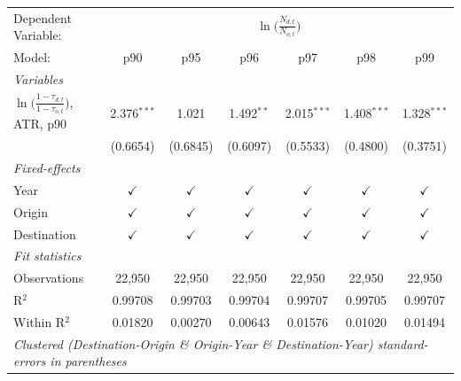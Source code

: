 \documentclass[11pt]{article}
\begin{document}
\begin{table}[H]
	\centering
	\begin{threeparttable}[b]
		\small
		\begin{tabular}{lcccccc}
			\toprule
			Dependent Variable: & \multicolumn{6}{c}{$\ln \biggr ( \frac{N_{d, t}}{N_{o, t}} \biggr)$}\\
			Model:                                                                       & p90           & p95           & p96           & p97           & p98           & p99\\  
			\midrule
			\emph{Variables}\\
			$\ln \biggr(\frac{1 - \tau_{d, t}}{1 - \tau_{o, t}} \biggr)$, ATR, p90       & 2.376$^{***}$ &   1.021             &  1.492$^{**}$              &   2.015$^{***}$             &   1.408$^{***}$            &   1.328$^{***}$\\   
			& (0.6654)      &  (0.6845)             &  (0.6097)              &  (0.5533)             &    (0.4800)           &  (0.3751) \\   
			\midrule
			\emph{Fixed-effects}\\
			Year                                                                         & $\checkmark$  & $\checkmark$  & $\checkmark$  & $\checkmark$  & $\checkmark$  & $\checkmark$\\   
			Origin                                                                       & $\checkmark$  & $\checkmark$  & $\checkmark$  & $\checkmark$  & $\checkmark$  & $\checkmark$\\   
			Destination                                                                  & $\checkmark$  & $\checkmark$  & $\checkmark$  & $\checkmark$  & $\checkmark$  & $\checkmark$\\   
			\midrule
			\emph{Fit statistics}\\
			Observations                                                                 & 22,950        & 22,950        & 22,950        & 22,950        & 22,950        & 22,950\\  
			R$^2$                                                                        & 0.99708       & 0.99703       & 0.99704       & 0.99707       & 0.99705       & 0.99707\\  
			Within R$^2$                                                                 & 0.01820       & 0.00270       & 0.00643       & 0.01576       & 0.01020       & 0.01494\\  
			\midrule
			\multicolumn{7}{l}{\emph{Clustered (Destination-Origin \& Origin-Year \& Destination-Year) standard-errors in parentheses}}\\

\end{tabular}
\end{threeparttable}
\end{table}
\end{document}
